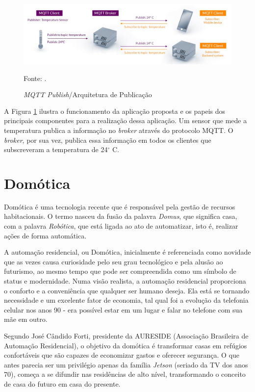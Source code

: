 \documentclass[
12pt,
openany, %
oneside, %
a4paper,			
english,			
brazil			        %
]{abntbibufjf}
\begin{document}
    
	\begin{figure}[!htb]
		\centering
		\includegraphics[scale=0.5]{Figuras/12.JPG}
		\caption{\textit{MQTT Publish}/Arquitetura de Publicação}
		\label{protocoloMQTT}
		\par Fonte: \cite{MQTT}.
	\end{figure}
	
    A Figura \ref{protocoloMQTT} ilustra o funcionamento da aplicação proposta e os papeis dos principais componentes para a realização dessa aplicação. Um sensor que mede a temperatura publica a informação no \textit{broker} através do protocolo MQTT. O \textit{broker}, por sua vez, publica essa informação em todos os clientes que subscreveram a temperatura de 24$^{\circ}$ C.
	
    
    \section{Domótica}
    
    Domótica é uma tecnologia recente que é responsável pela gestão de recursos habitacionais. O termo nasceu da fusão da palavra \textit{Domus}, que significa casa, com a palavra \textit{Robótica}, que está ligada ao ato de automatizar, isto é, realizar ações de forma automática. \cite{SISLITE}
    
    A automação residencial, ou Domótica, inicialmente é referenciada como novidade que as vezes causa curiosidade pelo seu grau tecnológico e pela alusão ao futurismo, ao mesmo tempo que pode ser compreendida como um símbolo de status e modernidade. Numa visão realista, a automação residencial proporciona o conforto e a conveniência que qualquer ser humano deseja. Ela está se tornando necessidade e um excelente fator de economia, tal qual foi a evolução da telefonia celular nos anos 90 - era possível estar em um lugar e falar no telefone com sua mãe em outro.
    
    Segundo José Cândido Forti, presidente da AURESIDE (Associação Brasileira de Automação Residencial), o objetivo da domótica é transformar casas em refúgios confortáveis que são capazes de economizar gastos e oferecer segurança. O que antes parecia ser um privilégio apenas da família \textit{Jetson} (seriado da TV dos anos 70), começa a se difundir nas residências de alto nível, transformando o conceito de casa do futuro em casa do presente. \cite{BUNEMER}
    
\end{document}
